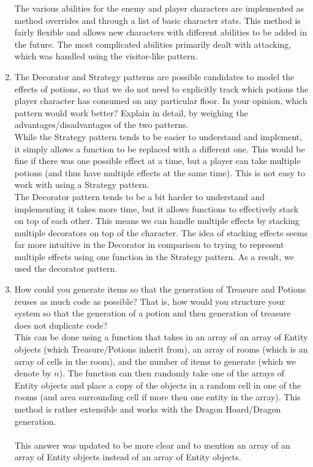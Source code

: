 \documentclass[12pt]{article}
\begin{document}
\begin{enumerate}
The various abilities for the enemy and player characters are implemented as method overrides and through a list of basic character stats. This method is fairly flexible and allows new characters with different abilities to be added in the future. The most complicated abilities primarily dealt with attacking, which was handled using the visitor-like pattern.


\item The Decorator and Strategy patterns are possible candidates to model the effects of potions, so that we do not need to explicitly track which potions the player character has consumed on any particular floor. In your opinion, which pattern would work better? Explain in detail, by weighing the advantages/disadvantages of the two patterns.\\


While the Strategy pattern tends to be easier to understand and implement, it simply allows a function to be replaced with a different one. This would be fine if there was one possible effect at a time, but a player can take multiple potions (and thus have multiple effects at the same time). This is not easy to work with using a Strategy pattern.\\

The Decorator pattern tends to be a bit harder to understand and implementing it takes more time, but it allows functions to effectively stack on top of each other. This means we can handle multiple effects by stacking multiple decorators on top of the character. The idea of stacking effects seems far more intuitive in the Decorator in comparison to trying to represent multiple effects using one function in the Strategy pattern. As a result, we used the decorator pattern.

\item How could you generate items so that the generation of Treasure and Potions reuses as much code as possible? That is, how would you structure your system so that the generation of a potion and then generation of treasure does not duplicate code?\\

This can be done using a function that takes in an array of an array of Entity objects (which Treasure/Potions inherit from), an array of rooms (which is an array of cells in the room), and the number of items to generate (which we denote by $n$). The function can then randomly take one of the arrays of Entity objects and place a copy of the objects in a random cell in one of the rooms (and area surrounding cell if more then one entity in the array). This method is rather extensible and works with the Dragon Hoard/Dragon generation. \\
\\
This answer was updated to be more clear and to mention an array of an array of Entity objects instead of an array of Entity objects.
\end{enumerate}
\end{document}
